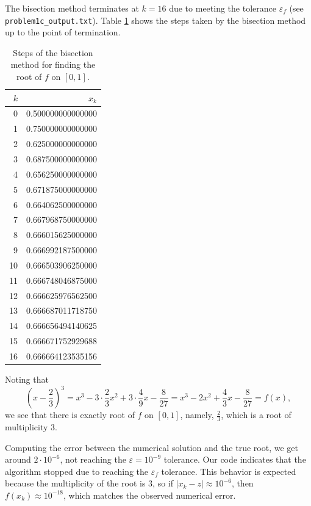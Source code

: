 \documentclass{homework}
\begin{document}
\begin{alphaparts}
	\questionpart The bisection method terminates at $k = 16$ due to meeting the tolerance $\varepsilon_f$ (see \texttt{problem1c\_output.txt}). Table \ref{table:bisection} shows the steps taken by the bisection method up to the point of termination.
	\begin{table}[htb!]
		\centering
		\begin{tabular}{@{}rr@{}}
			\toprule
			$k$ & $x_k$ \\
			\midrule
			0 & 0.500000000000000 \\
			1 & 0.750000000000000 \\
			2 & 0.625000000000000 \\
			3 & 0.687500000000000 \\
			4 & 0.656250000000000 \\
			5 & 0.671875000000000 \\
			6 & 0.664062500000000 \\
			7 & 0.667968750000000 \\
			8 & 0.666015625000000 \\
			9 & 0.666992187500000 \\
			10 & 0.666503906250000 \\
			11 & 0.666748046875000 \\
			12 & 0.666625976562500 \\
			13 & 0.666687011718750 \\
			14 & 0.666656494140625 \\
			15 & 0.666671752929688 \\
			16 & 0.666664123535156 \\
			\bottomrule
		\end{tabular}
		\caption{Steps of the bisection method for finding the root of $f$ on $[0,1]$.}
		\label{table:bisection}
	\end{table}
	
	\questionpart Noting that
	\begin{equation*}
		\left(x-\frac{2}{3}\right)^3 = x^3 - 3\cdot\frac{2}{3}x^2 + 3\cdot\frac{4}{9}x - \frac{8}{27} = x^3-2x^2+\frac{4}{3}x - \frac{8}{27} = f(x),
	\end{equation*}
	we see that there is exactly root of $f$ on $[0,1]$, namely, $\frac{2}{3}$, which is a root of multiplicity 3.
	
	Computing the error between the numerical solution and the true root, we get around $2\cdot10^{-6}$, not reaching the $\varepsilon = 10^{-9}$ tolerance. Our code indicates that the algorithm stopped due to reaching the $\varepsilon_f$ tolerance. This behavior is expected because the multiplicity of the root is $3$, so if $|x_k - z| \approx 10^{-6}$, then $f(x_k) \approx 10^{-18}$, which matches the observed numerical error.
\end{alphaparts}
\end{document}
